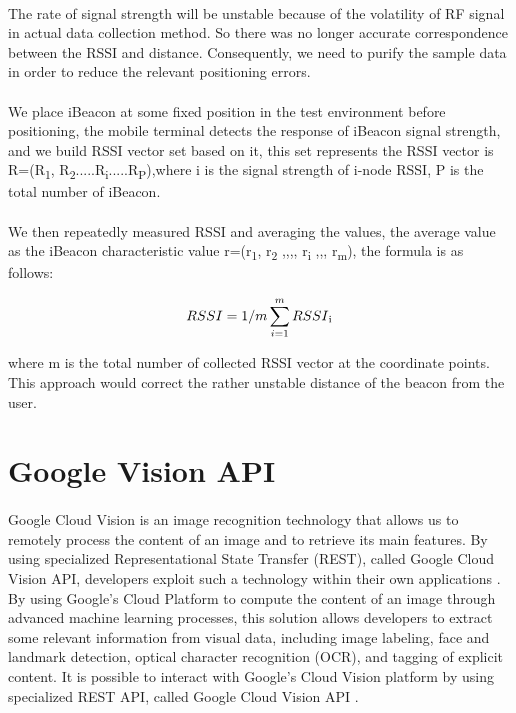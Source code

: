 \documentclass[12pt]{article}
\begin{document}
\paragraph{}The rate of signal strength will be unstable because of the volatility of RF signal in actual data collection method. So there was no longer accurate correspondence between the RSSI and distance. Consequently, we need to purify the sample data in order to reduce the relevant positioning errors.

\paragraph{}We place iBeacon at some fixed position in the test environment before positioning, the mobile terminal detects the response of iBeacon signal strength, and we build RSSI vector set based on it, this set represents the RSSI vector is R=(R\textsubscript{1}, R\textsubscript{2}.....R\textsubscript{i}.....R\textsubscript{P}),where i is the signal strength of i-node RSSI, P is the total number of iBeacon.

\paragraph{}We then repeatedly measured RSSI and averaging the values, the average value as the iBeacon characteristic value r=(r\textsubscript{1}, r\textsubscript{2} ,,,, r\textsubscript{i} ,,, r\textsubscript{m}), the formula is as follows:

\begin{equation}
RSSI = 1/m \sum_{i=1}^m RSSI \textsubscript{i}
\end{equation}

where m is the total number of collected RSSI vector at the coordinate points. This approach would correct the rather unstable distance of the beacon from the user. 

\section{Google Vision API}
\label{vision}
\paragraph{}Google Cloud Vision is an image recognition technology that allows us to remotely process the content of an image and to retrieve its main features. By using specialized  Representational State Transfer (REST), called Google Cloud Vision API, developers exploit such a technology within their own applications \cite{vision}. By using Google’s Cloud Platform to compute the content of an image through advanced machine learning processes, this solution allows developers to extract some relevant information from visual data, including image labeling, face and landmark detection, optical character recognition (OCR), and tagging of explicit content. It is possible to interact with Google’s Cloud Vision platform by using specialized REST API, called Google Cloud Vision API \cite{vision}.
\end{document}

